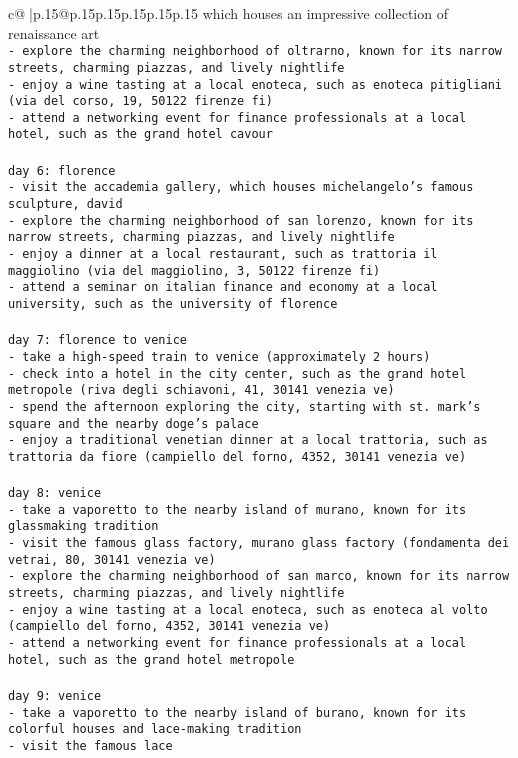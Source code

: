 \documentclass{article}
\begin{document}
{\begin{supertabular}{c@{$\;$}|p{.15\linewidth}@{}p{.15\linewidth}p{.15\linewidth}p{.15\linewidth}p{.15\linewidth}p{.15\linewidth}}
{{{which houses an impressive collection of renaissance art\\ \tt - explore the charming neighborhood of oltrarno, known for its narrow streets, charming piazzas, and lively nightlife\\ \tt - enjoy a wine tasting at a local enoteca, such as enoteca pitigliani (via del corso, 19, 50122 firenze fi)\\ \tt - attend a networking event for finance professionals at a local hotel, such as the grand hotel cavour\\ \tt \\ \tt day 6: florence\\ \tt - visit the accademia gallery, which houses michelangelo's famous sculpture, david\\ \tt - explore the charming neighborhood of san lorenzo, known for its narrow streets, charming piazzas, and lively nightlife\\ \tt - enjoy a dinner at a local restaurant, such as trattoria il maggiolino (via del maggiolino, 3, 50122 firenze fi)\\ \tt - attend a seminar on italian finance and economy at a local university, such as the university of florence\\ \tt \\ \tt day 7: florence to venice\\ \tt - take a high-speed train to venice (approximately 2 hours)\\ \tt - check into a hotel in the city center, such as the grand hotel metropole (riva degli schiavoni, 41, 30141 venezia ve)\\ \tt - spend the afternoon exploring the city, starting with st. mark's square and the nearby doge's palace\\ \tt - enjoy a traditional venetian dinner at a local trattoria, such as trattoria da fiore (campiello del forno, 4352, 30141 venezia ve)\\ \tt \\ \tt day 8: venice\\ \tt - take a vaporetto to the nearby island of murano, known for its glassmaking tradition\\ \tt - visit the famous glass factory, murano glass factory (fondamenta dei vetrai, 80, 30141 venezia ve)\\ \tt - explore the charming neighborhood of san marco, known for its narrow streets, charming piazzas, and lively nightlife\\ \tt - enjoy a wine tasting at a local enoteca, such as enoteca al volto (campiello del forno, 4352, 30141 venezia ve)\\ \tt - attend a networking event for finance professionals at a local hotel, such as the grand hotel metropole\\ \tt \\ \tt day 9: venice\\ \tt - take a vaporetto to the nearby island of burano, known for its colorful houses and lace-making tradition\\ \tt - visit the famous lace }}}
\end{supertabular}}
\end{document}
